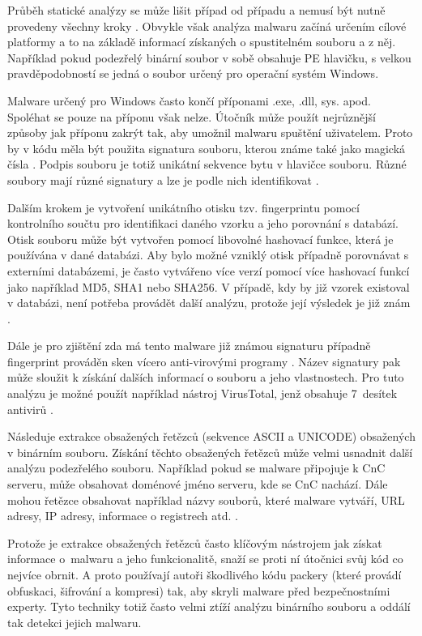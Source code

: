 Průběh statické analýzy se může lišit případ od případu a nemusí být nutně provedeny všechny kroky \cite{monnappaka2018}. Obvykle však analýza malwaru začíná určením cílové platformy a to na základě informací získaných o spustitelném souboru a z něj. Například pokud podezřelý binární soubor v sobě obsahuje PE hlavičku, s velkou pravděpodobností se jedná o soubor určený pro operační systém Windows. 

Malware určený pro Windows často končí příponami .exe, .dll, sys. apod. Spoléhat se pouze na příponu však nelze. Útočník může použít nejrůznější způsoby jak příponu zakrýt tak, aby umožnil malwaru spuštění uživatelem. Proto by v kódu měla být použita signatura souboru, kterou známe také jako magická čísla\label{magic_numbers} \cite{magic_number}. Podpis souboru je totiž unikátní sekvence bytu v hlavičce souboru. Různé soubory mají různé signatury a lze je podle nich identifikovat \cite{file_signatures_2020}.

Dalším krokem je vytvoření unikátního otisku tzv. fingerprintu pomocí kontrolního součtu pro identifikaci daného vzorku a jeho porovnání s databází. Otisk souboru může být vytvořen pomocí libovolné hashovací funkce, která je používána v dané databázi. Aby bylo možné vzniklý otisk případně porovnávat s externími databázemi, je často vytvářeno více verzí pomocí více hashovací funkcí jako například MD5, SHA1 nebo SHA256. V případě, kdy by již vzorek existoval v databázi, není potřeba provádět další analýzu, protože její výsledek je již znám \cite{sikorski2012practical}.

Dále je pro zjištění zda má tento malware již známou signaturu případně fingerprint prováděn sken vícero anti-virovými programy \cite{sikorski2012practical}. Název signatury pak může sloužit k získání dalších informací o souboru a jeho vlastnostech. Pro tuto analýzu je možné použít například  nástroj VirusTotal, jenž obsahuje 7~desítek antivirů \cite{virustotal_howitworks}. 
    
Následuje extrakce obsažených řetězců (sekvence ASCII a UNICODE) obsažených v binárním souboru. Získání těchto obsažených řetězců může velmi usnadnit další analýzu podezřelého souboru. Například pokud se malware připojuje k CnC serveru, může obsahovat doménové jméno serveru, kde se CnC nachází. Dále mohou řetězce obsahovat například názvy souborů, které malware vytváří, URL adresy, IP adresy, informace o registrech atd. \cite{monnappaka2018}.

Protože je extrakce obsažených řetězců často klíčovým nástrojem jak získat informace o~malwaru a jeho funkcionalitě, snaží se proti ní útočnici svůj kód co nejvíce obrnit. A proto používají autoři škodlivého kódu packery (které provádí obfuskaci, šifrování a kompresi) tak, aby skryli malware před bezpečnostními experty. Tyto techniky totiž často velmi ztíží analýzu binárního souboru a oddálí tak detekci jejich malwaru.

